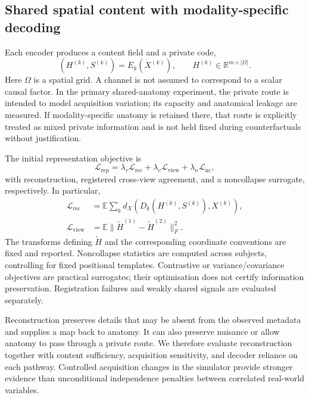 \documentclass[10pt,twocolumn,letterpaper]{article}
\newcommand{\E}{\mathbb{E}}
\newcommand{\R}{\mathbb{R}}
\newcommand{\rec}{\mathrm{rec}}
\begin{document}
\subsection{Shared spatial content with modality-specific decoding}

Each encoder produces a content field and a private code,
\begin{equation}
 (H^{(k)},S^{(k)})=E_k(X^{(k)}),\qquad
 H^{(k)}\in\R^{m\times|\Omega|}.
\end{equation}
Here $\Omega$ is a spatial grid. A channel is not assumed to correspond to a scalar causal factor. In the primary shared-anatomy experiment, the private route is intended to model acquisition variation; its capacity and anatomical leakage are measured. If modality-specific anatomy is retained there, that route is explicitly treated as mixed private information and is not held fixed during counterfactuals without justification.

The initial representation objective is
\begin{equation}
 \mathcal L_{\mathrm{rep}}
 =\lambda_r\mathcal L_{\rec}
 +\lambda_v\mathcal L_{\mathrm{view}}
 +\lambda_n\mathcal L_{\mathrm{nc}},
 \label{eq:representation-loss}
\end{equation}
with reconstruction, registered cross-view agreement, and a noncollapse surrogate, respectively. In particular,
\begin{align}
 \mathcal L_{\rec}&=\E\sum_k d_X(D_k(H^{(k)},S^{(k)}),X^{(k)}),\\
 \mathcal L_{\mathrm{view}}&=\E\|\widetilde H^{(1)}-\widetilde H^{(2)}\|_F^2.
\end{align}
The transforms defining $\widetilde H$ and the corresponding coordinate conventions are fixed and reported. Noncollapse statistics are computed across subjects, controlling for fixed positional templates. Contrastive or variance/covariance objectives are practical surrogates; their optimisation does not certify information preservation. Registration failures and weakly shared signals are evaluated separately.

Reconstruction preserves details that may be absent from the observed metadata and supplies a map back to anatomy. It can also preserve nuisance or allow anatomy to pass through a private route. We therefore evaluate reconstruction together with content sufficiency, acquisition sensitivity, and decoder reliance on each pathway. Controlled acquisition changes in the simulator provide stronger evidence than unconditional independence penalties between correlated real-world variables.
\end{document}
